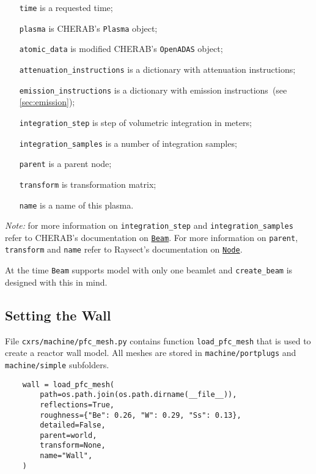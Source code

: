 \documentclass[../main.tex]{subfiles}
\begin{document}
\begin{itemize}[align=left]
    \item[\texttt{time}] is a requested time;
    \item[\texttt{plasma}] is CHERAB's \texttt{Plasma} object;
    \item[\texttt{atomic\_data}] is modified CHERAB's \texttt{OpenADAS} object;
    \item[\texttt{attenuation\_instructions}] is a dictionary with attenuation instructions;
    \item[\texttt{emission\_instructions}] is a dictionary with emission instructions~(see \cref{sec:emission});
    \item[\texttt{integration\_step}] is step of volumetric integration in meters;
    \item[\texttt{integration\_samples}] is a number of integration samples;
    \item[\texttt{parent}] is a parent node;
    \item[\texttt{transform}] is transformation matrix;
    \item[\texttt{name}] is a name of this plasma.
\end{itemize}
\emph{Note: } for more information on \texttt{integration\_step} and \texttt{integration\_samples} refer to CHERAB's documentation on \href{https://cherab.github.io/documentation/plasmas/particle_beams.html?highlight=beam#cherab.core.Beam}{\texttt{Beam}}.
For more information on \texttt{parent}, \texttt{transform} and \texttt{name} refer to Raysect's documentation on \href{https://raysect.github.io/documentation/api_reference/edge/raysect_edge_scenegraph.html?highlight=node#raysect.edge.scenegraph.node.Node}{\texttt{Node}}.

At the time \texttt{Beam} supports model with only one beamlet and \texttt{create\_beam} is designed with this in mind.

\subsection{Setting the Wall}%
\label{sec:wall}

File \texttt{cxrs/machine/pfc\_mesh.py} contains function \texttt{load\_pfc\_mesh} that is used to create a reactor wall model. All meshes are stored in \texttt{machine/portplugs} and \texttt{machine/simple} subfolders.

\begin{verbatim}
    wall = load_pfc_mesh(
        path=os.path.join(os.path.dirname(__file__)),
        reflections=True,
        roughness={"Be": 0.26, "W": 0.29, "Ss": 0.13},
        detailed=False,
        parent=world,
        transform=None,
        name="Wall",
    )
\end{verbatim}
\end{document}
